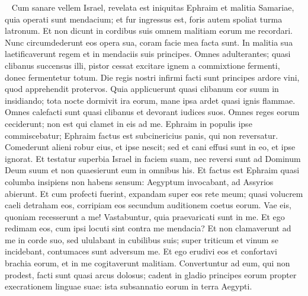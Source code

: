 \begin{biblechapter}   
\verse Cum sanare vellem Israel, revelata est iniquitas Ephraim et malitia Samariae, quia operati sunt mendacium; et fur ingressus est, foris autem spoliat turma latronum. 
\verse Et non dicunt in cordibus suis omnem malitiam eorum me recordari. Nunc circumdederunt eos opera sua, coram facie mea facta sunt. 
\verse In malitia sua laetificaverunt regem et in mendaciis suis principes. 
\verse Omnes adulterantes; quasi clibanus succensus illi, pistor cessat excitare ignem a commixtione fermenti, donec fermentetur totum. 
\verse Die regis nostri infirmi facti sunt principes ardore vini, quod apprehendit protervos. 
\verse Quia applicuerunt quasi clibanum cor suum in insidiando; tota nocte dormivit ira eorum, mane ipsa ardet quasi ignis flammae. 
\verse Omnes calefacti sunt quasi clibanus et devorant iudices suos. Omnes reges eorum ceciderunt; non est qui clamet in eis ad me. 
\verse Ephraim in populis ipse commiscebatur; Ephraim factus est subcinericius panis, qui non reversatur. 
\verse Comederunt alieni robur eius, et ipse nescit; sed et cani effusi sunt in eo, et ipse ignorat. 
\verse Et testatur superbia Israel in faciem suam, nec reversi sunt ad Dominum Deum suum et non quaesierunt eum in omnibus his. 
\verse Et factus est Ephraim quasi columba insipiens non habens sensum: Aegyptum invocabant, ad Assyrios abierunt. 
\verse Et cum profecti fuerint, expandam super eos rete meum; quasi volucrem caeli detraham eos, corripiam eos secundum auditionem coetus eorum. 
\verse Vae eis, quoniam recesserunt a me! Vastabuntur, quia praevaricati sunt in me. Et ego redimam eos, cum ipsi locuti sint contra me mendacia? 
\verse Et non clamaverunt ad me in corde suo, sed ululabant in cubilibus suis; super triticum et vinum se incidebant, contumaces sunt adversum me. 
\verse Et ego erudivi eos et confortavi brachia eorum, et in me cogitaverunt malitiam. 
\verse Convertuntur ad eum, qui non prodest, facti sunt quasi arcus dolosus; cadent in gladio principes eorum propter execrationem linguae suae: ista subsannatio eorum in terra Aegypti. 
\end{biblechapter}

